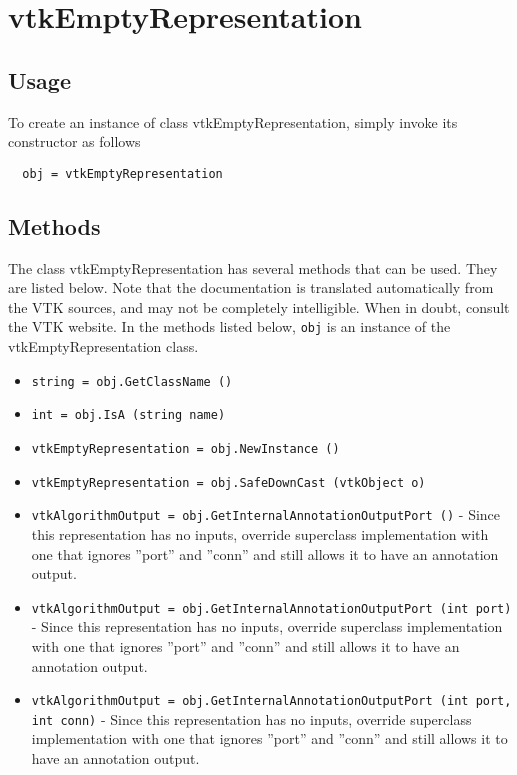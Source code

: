 \section{vtkEmptyRepresentation}

\subsection{Usage}


To create an instance of class vtkEmptyRepresentation, simply
invoke its constructor as follows
\begin{verbatim}
  obj = vtkEmptyRepresentation
\end{verbatim}
\subsection{Methods}

The class vtkEmptyRepresentation has several methods that can be used.
  They are listed below.
Note that the documentation is translated automatically from the VTK sources,
and may not be completely intelligible.  When in doubt, consult the VTK website.
In the methods listed below, \verb|obj| is an instance of the vtkEmptyRepresentation class.
\begin{itemize}
\item  \verb|string = obj.GetClassName ()|

\item  \verb|int = obj.IsA (string name)|

\item  \verb|vtkEmptyRepresentation = obj.NewInstance ()|

\item  \verb|vtkEmptyRepresentation = obj.SafeDownCast (vtkObject o)|

\item  \verb|vtkAlgorithmOutput = obj.GetInternalAnnotationOutputPort ()| -  Since this representation has no inputs, override superclass 
 implementation with one that ignores ''port'' and ''conn'' and still allows it
 to have an annotation output.

\item  \verb|vtkAlgorithmOutput = obj.GetInternalAnnotationOutputPort (int port)| -  Since this representation has no inputs, override superclass 
 implementation with one that ignores ''port'' and ''conn'' and still allows it
 to have an annotation output.

\item  \verb|vtkAlgorithmOutput = obj.GetInternalAnnotationOutputPort (int port, int conn)| -  Since this representation has no inputs, override superclass 
 implementation with one that ignores ''port'' and ''conn'' and still allows it
 to have an annotation output.

\end{itemize}

